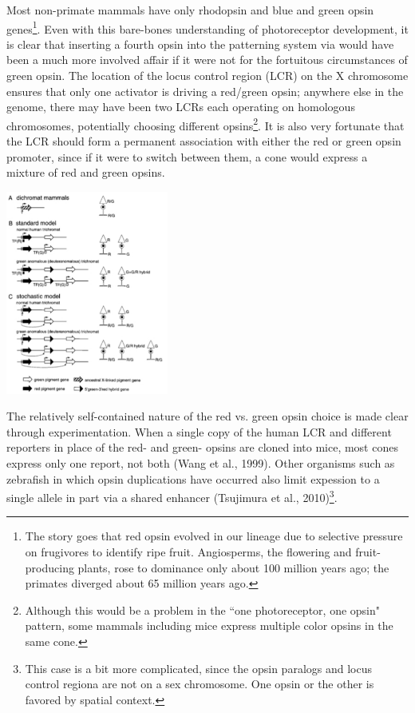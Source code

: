 \documentclass{article}
\begin{document}
Most non-primate mammals have only rhodopsin and blue and green opsin genes\footnote{The story goes that red opsin evolved in our lineage due to selective pressure on frugivores to identify ripe fruit. Angiosperms, the flowering and fruit-producing plants, rose to dominance only about 100 million years ago; the primates diverged about 65 million years ago.}. Even with this bare-bones understanding of photoreceptor development, it is clear that inserting a fourth opsin into the patterning system via would have been a much more involved affair if it were not for the fortuitous circumstances of green opsin. The location of the locus control region (LCR) on the X chromosome ensures that only one activator is driving a red/green opsin; anywhere else in the genome, there may have been two LCRs each operating on homologous chromosomes, potentially choosing different opsins\footnote{Although this would be a problem in the ``one photoreceptor, one opsin" pattern, some mammals including mice express multiple color opsins in the same cone.}. It is also very fortunate that the LCR should form a permanent association with either the red or green opsin promoter, since if it were to switch between them, a cone would express a mixture of red and green opsins.

\begin{center}
\includegraphics[width=0.4\textwidth]{lcr_stochastic.pdf}
\end{center}


The relatively self-contained nature of the red vs. green opsin choice is made clear through experimentation. When a single copy of the human LCR and different reporters in place of the red- and green- opsins are cloned into mice, most cones express only one report, not both (Wang et al., 1999). Other organisms such as zebrafish in which opsin duplications have occurred also limit expession to a single allele in part via a shared enhancer (Tsujimura et al., 2010)\footnote{This case is a bit more complicated, since the opsin paralogs and locus control regiona are not on a sex chromosome. One opsin or the other is favored by spatial context.}.
\end{document}
